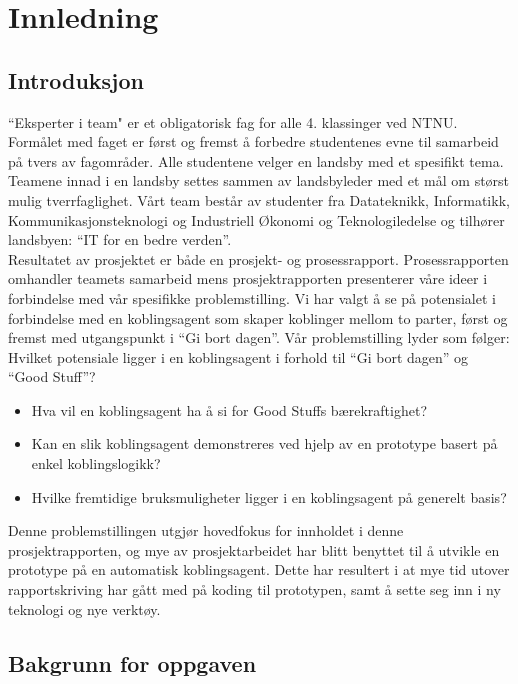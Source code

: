 \section{Innledning}
\subsection{Introduksjon}

``Eksperter i team" er et obligatorisk fag for alle 4. klassinger ved NTNU. Formålet med faget er først og fremst å forbedre studentenes evne til samarbeid på tvers av fagområder. Alle studentene velger en landsby med et spesifikt tema. Teamene innad i en landsby settes sammen av landsbyleder med et mål om størst mulig tverrfaglighet. Vårt team består av studenter fra Datateknikk, Informatikk, Kommunikasjonsteknologi og Industriell Økonomi og Teknologiledelse og tilhører landsbyen: ``IT for en bedre verden”.\\

Resultatet av prosjektet er både en prosjekt- og prosessrapport. Prosessrapporten omhandler teamets samarbeid mens prosjektrapporten presenterer våre ideer i forbindelse med vår spesifikke problemstilling. Vi har valgt å se på potensialet i forbindelse med en koblingsagent som skaper koblinger mellom to parter, først og fremst med utgangspunkt i ``Gi bort dagen”. Vår problemstilling lyder som følger:
Hvilket potensiale ligger i en koblingsagent i forhold til ``Gi bort dagen” og ``Good Stuff”?

\begin{itemize}
  \item Hva vil en koblingsagent ha å si for Good Stuffs bærekraftighet?
  \item Kan en slik koblingsagent demonstreres ved hjelp av en prototype basert på enkel koblingslogikk?
  \item Hvilke fremtidige bruksmuligheter ligger i en koblingsagent på generelt basis?
\end{itemize}

Denne problemstillingen utgjør hovedfokus for innholdet i denne prosjektrapporten, og mye av prosjektarbeidet har blitt benyttet til å utvikle en prototype på en automatisk koblingsagent. Dette har resultert i at mye tid utover rapportskriving har gått med på koding til prototypen, samt å sette seg inn i ny teknologi og nye verktøy.

\subsection{Bakgrunn for oppgaven}

